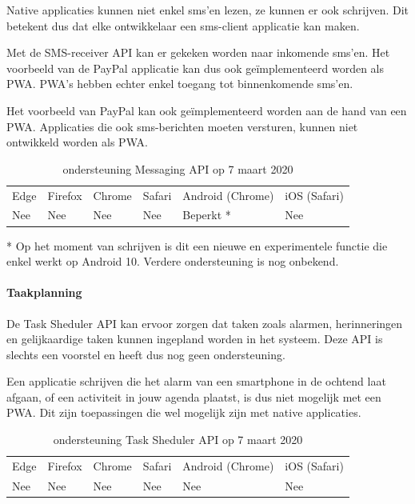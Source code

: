 	Native applicaties kunnen niet enkel sms’en lezen, ze kunnen er ook schrijven. Dit betekent dus dat elke ontwikkelaar een sms-client applicatie kan maken.
	
	Met de SMS-receiver API \autocite{Fullea2015} kan er gekeken worden naar inkomende sms'en. Het voorbeeld van de PayPal applicatie kan dus ook geïmplementeerd worden als PWA. PWA's hebben echter enkel toegang tot binnenkomende sms'en. 
	
	Het voorbeeld van PayPal kan ook geïmplementeerd worden aan de hand van een PWA. Applicaties die ook sms-berichten moeten versturen, kunnen niet ontwikkeld worden als PWA.
	
	\begin{table}[H]
		\centering
		\begin{tabular}{llllll}
			Edge & Firefox & Chrome & Safari & Android (Chrome) & iOS (Safari) \\
			Nee   & Nee      &  Nee     & Nee     & Beperkt *             & Nee          
		\end{tabular}	
		\caption{ondersteuning Messaging API op 7 maart 2020}{* Op het moment van schrijven is dit een nieuwe en experimentele functie die enkel werkt op 
			Android 10. Verdere ondersteuning is nog onbekend.}
	\end{table}	
	
	
	
	\paragraph{Taakplanning}
	De Task Sheduler API \autocite{Kulkarni2015} kan ervoor zorgen dat taken zoals alarmen, herinneringen en gelijkaardige taken kunnen ingepland worden in het systeem. Deze API is slechts een voorstel en heeft dus nog geen ondersteuning.
	
	Een applicatie schrijven die het alarm van een smartphone in de ochtend laat afgaan, of een activiteit in jouw agenda plaatst, is dus niet mogelijk met een PWA. Dit zijn toepassingen die wel mogelijk zijn met native applicaties.
	
	\begin{table}[H]
		\centering
		\begin{tabular}{llllll}
			Edge & Firefox & Chrome & Safari & Android (Chrome) & iOS (Safari) \\
			Nee   & Nee      &  Nee     & Nee     & Nee               & Nee          
		\end{tabular}	
		\caption{ondersteuning Task Sheduler API op 7 maart 2020}
	\end{table}	
	

